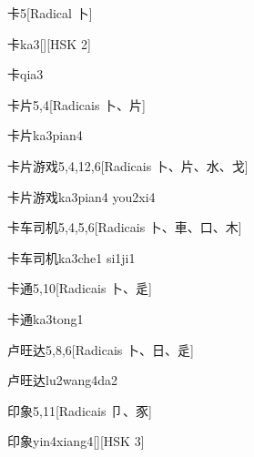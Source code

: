 \begin{entry}{卡}{5}[Radical ⼘]
  \begin{phonetics}{卡}{ka3}[][HSK 2]
  \end{phonetics}
  \begin{phonetics}{卡}{qia3}
  \end{phonetics}
\end{entry}

\begin{entry}{卡片}{5,4}[Radicais ⼘、⽚]
  \begin{phonetics}{卡片}{ka3pian4}
  \end{phonetics}
\end{entry}

\begin{entry}{卡片游戏}{5,4,12,6}[Radicais ⼘、⽚、⽔、⼽]
  \begin{phonetics}{卡片游戏}{ka3pian4 you2xi4}
  \end{phonetics}
\end{entry}

\begin{entry}{卡车司机}{5,4,5,6}[Radicais ⼘、⾞、⼝、⽊]
  \begin{phonetics}{卡车司机}{ka3che1 si1ji1}
  \end{phonetics}
\end{entry}

\begin{entry}{卡通}{5,10}[Radicais ⼘、⾡]
  \begin{phonetics}{卡通}{ka3tong1}
  \end{phonetics}
\end{entry}

\begin{entry}{卢旺达}{5,8,6}[Radicais ⼘、⽇、⾡]
  \begin{phonetics}{卢旺达}{lu2wang4da2}
  \end{phonetics}
\end{entry}

\begin{entry}{印象}{5,11}[Radicais ⼙、⾗]
  \begin{phonetics}{印象}{yin4xiang4}[][HSK 3]
  \end{phonetics}
\end{entry}

